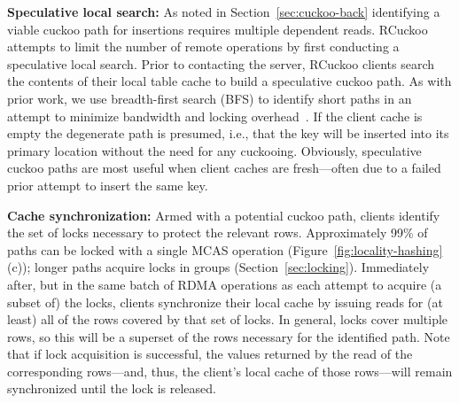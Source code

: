 \textbf{Speculative local search:} As noted in
Section~\ref{sec:cuckoo-back} identifying a viable cuckoo path for
insertions requires multiple dependent reads.  RCuckoo attempts to
limit the number of remote operations by first conducting a
speculative local search. Prior to contacting the server, RCuckoo
clients search the contents of their local table cache to build a
speculative cuckoo path.  As with prior work, we use breadth-first
search (BFS) to identify short paths in an attempt to minimize
bandwidth and locking overhead~\cite{cuckoo-improvements}.  If the
client cache is empty the degenerate path is presumed, i.e., that the
key will be inserted into its primary location
without the need for any cuckooing.  Obviously, speculative cuckoo
paths are most useful when client caches are fresh---often due to a
failed prior attempt to insert the same key.


\textbf{Cache synchronization:} Armed with a potential
cuckoo path, clients identify the set of locks necessary to
protect the relevant rows.  
Approximately 99\% of paths can be locked with a single MCAS
operation (Figure~\ref{fig:locality-hashing}(c)); longer
paths acquire locks in groups (Section~\ref{sec:locking}).
Immediately after, but in the same batch of RDMA operations
as each attempt to acquire (a subset of) the locks, clients
synchronize their local cache by issuing reads for (at
least) all of the rows covered by that set of locks.  In
general, locks cover multiple rows, so this will be a
superset of the rows necessary for the identified path.
Note that if lock acquisition is successful, the values
returned by the read of the corresponding rows---and, thus,
the client's local cache of those rows---will remain
synchronized until the lock is released.

